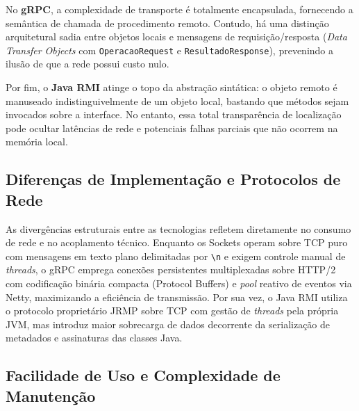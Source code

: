 \documentclass[12pt, a4paper]{article}
\begin{document}
No \textbf{gRPC}, a complexidade de transporte é totalmente encapsulada, fornecendo a semântica de chamada de procedimento remoto. Contudo, há uma distinção arquitetural sadia entre objetos locais e mensagens de requisição/resposta (\textit{Data Transfer Objects} com \texttt{OperacaoRequest} e \texttt{ResultadoResponse}), prevenindo a ilusão de que a rede possui custo nulo.

Por fim, o \textbf{Java RMI} atinge o topo da abstração sintática: o objeto remoto é manuseado indistinguivelmente de um objeto local, bastando que métodos sejam invocados sobre a interface. No entanto, essa total transparência de localização pode ocultar latências de rede e potenciais falhas parciais que não ocorrem na memória local.

\subsection{Diferenças de Implementação e Protocolos de Rede}

As divergências estruturais entre as tecnologias refletem diretamente no consumo de rede e no acoplamento técnico. Enquanto os Sockets operam sobre TCP puro com mensagens em texto plano delimitadas por \texttt{\textbackslash n} e exigem controle manual de \textit{threads}, o gRPC emprega conexões persistentes multiplexadas sobre HTTP/2 com codificação binária compacta (Protocol Buffers) e \textit{pool} reativo de eventos via Netty, maximizando a eficiência de transmissão. Por sua vez, o Java RMI utiliza o protocolo proprietário JRMP sobre TCP com gestão de \textit{threads} pela própria JVM, mas introduz maior sobrecarga de dados decorrente da serialização de metadados e assinaturas das classes Java.

\subsection{Facilidade de Uso e Complexidade de Manutenção}
\end{document}
